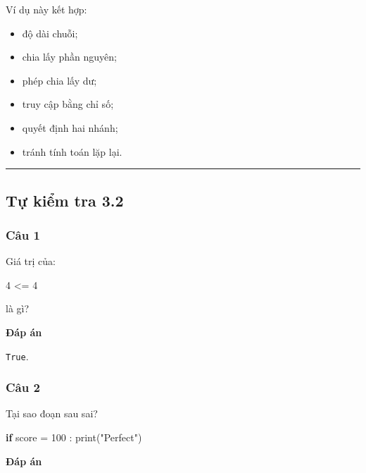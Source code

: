 \documentclass[
  11pt,
  a4paper,
]{article}
\newenvironment{Shaded}{}{}
\newcommand{\BuiltInTok}[1]{\textcolor[rgb]{0.00,0.50,0.00}{#1}}
\newcommand{\ControlFlowTok}[1]{\textcolor[rgb]{0.00,0.44,0.13}{\textbf{#1}}}
\newcommand{\DecValTok}[1]{\textcolor[rgb]{0.25,0.63,0.44}{#1}}
\newcommand{\NormalTok}[1]{#1}
\newcommand{\OperatorTok}[1]{\textcolor[rgb]{0.40,0.40,0.40}{#1}}
\newcommand{\StringTok}[1]{\textcolor[rgb]{0.25,0.44,0.63}{#1}}
\providecommand{\tightlist}{%
  \setlength{\itemsep}{0pt}\setlength{\parskip}{0pt}}
\begin{document}
Ví dụ này kết hợp:

\begin{itemize}
\tightlist
\item
  độ dài chuỗi;
\item
  chia lấy phần nguyên;
\item
  phép chia lấy dư;
\item
  truy cập bằng chỉ số;
\item
  quyết định hai nhánh;
\item
  tránh tính toán lặp lại.
\end{itemize}

\begin{center}\rule{0.5\linewidth}{0.5pt}\end{center}

\subsection{Tự kiểm tra 3.2}\label{tux1ef1-kiux1ec3m-tra-3.2}

\subsubsection{Câu 1}\label{cuxe2u-1-1}

Giá trị của:

\begin{Shaded}
\begin{Highlighting}[]
\DecValTok{4} \OperatorTok{\textless{}=} \DecValTok{4}
\end{Highlighting}
\end{Shaded}

là gì?

\textbf{Đáp án}

\texttt{True}.

\subsubsection{Câu 2}\label{cuxe2u-2-1}

Tại sao đoạn sau sai?

\begin{Shaded}
\begin{Highlighting}[]
\ControlFlowTok{if}\NormalTok{ score }\OperatorTok{=} \DecValTok{100}\NormalTok{ :}
    \BuiltInTok{print}\NormalTok{(}\StringTok{"Perfect"}\NormalTok{)}
\end{Highlighting}
\end{Shaded}

\textbf{Đáp án}
\end{document}
